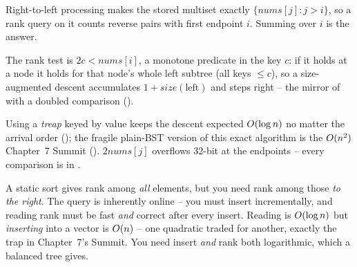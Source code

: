 \begin{observation}
Right-to-left processing makes the stored multiset exactly $\{\mathit{nums}[j]:j>i\}$, so a rank query on it
counts reverse pairs with first endpoint $i$. Summing over $i$ is the answer.
\end{observation}
\begin{observation}
The rank test is $2c<\mathit{nums}[i]$, a monotone predicate in the key $c$: if it holds at a node it holds
for that node's whole left subtree (all keys $\le c$), so a size-augmented descent accumulates
$1+\mathit{size}(\text{left})$ and steps right -- the mirror of  with a doubled comparison
().
\end{observation}
\begin{observation}
Using a \emph{treap} keyed by value keeps the descent expected $O(\log n)$ no matter the arrival order
(); the fragile plain-BST version of this exact algorithm is the $O(n^2)$
Chapter~7 Summit (). $2\mathit{nums}[j]$ overflows 32-bit at the endpoints -- every
comparison is in .
\end{observation}

\begin{thinkbox}
{A static sort gives rank among \emph{all} elements, but you need rank among those \emph{to the right}.
The query is inherently online -- you must insert incrementally, and reading rank must be fast \emph{and}
correct after every insert.}
{Reading is $O(\log n)$ but \emph{inserting} into a vector is $O(n)$ -- one quadratic traded for
another, exactly the trap in Chapter~7's Summit. You need insert \emph{and} rank both logarithmic, which a
balanced tree gives.}
\end{thinkbox}

